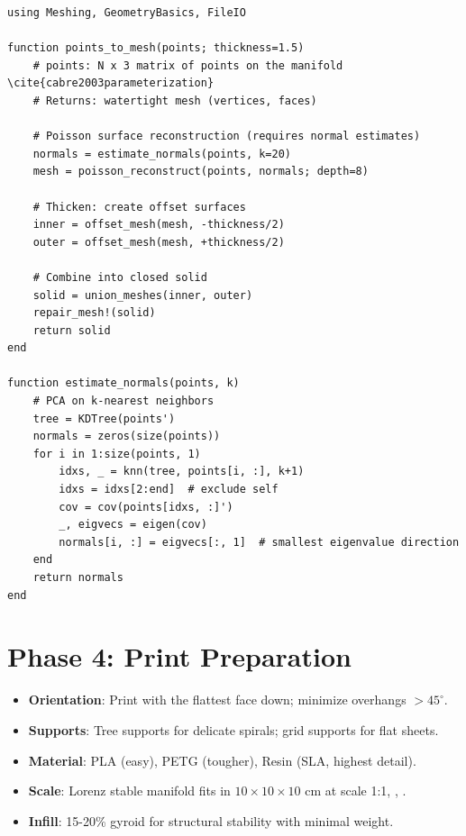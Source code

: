 \begin{lstlisting}[style=julia,caption=Mesh generation and thickening]
using Meshing, GeometryBasics, FileIO

function points_to_mesh(points; thickness=1.5)
    # points: N x 3 matrix of points on the manifold \cite{cabre2003parameterization}
    # Returns: watertight mesh (vertices, faces)
    
    # Poisson surface reconstruction (requires normal estimates)
    normals = estimate_normals(points, k=20)
    mesh = poisson_reconstruct(points, normals; depth=8)
    
    # Thicken: create offset surfaces
    inner = offset_mesh(mesh, -thickness/2)
    outer = offset_mesh(mesh, +thickness/2)
    
    # Combine into closed solid
    solid = union_meshes(inner, outer)
    repair_mesh!(solid)
    return solid
end

function estimate_normals(points, k)
    # PCA on k-nearest neighbors
    tree = KDTree(points')
    normals = zeros(size(points))
    for i in 1:size(points, 1)
        idxs, _ = knn(tree, points[i, :], k+1)
        idxs = idxs[2:end]  # exclude self
        cov = cov(points[idxs, :]')
        _, eigvecs = eigen(cov)
        normals[i, :] = eigvecs[:, 1]  # smallest eigenvalue direction
    end
    return normals
end
\end{lstlisting}

\section{Phase 4: Print Preparation}
\label{sec:3dp:printing}

\begin{itemize}
    \item \textbf{Orientation}: Print with the flattest face down; minimize overhangs $>45^\circ$.
    \item \textbf{Supports}: Tree supports for delicate spirals; grid supports for flat sheets.
    \item \textbf{Material}: PLA (easy), PETG (tougher), Resin (SLA, highest detail).
    \item \textbf{Scale}: Lorenz stable manifold fits in $10\times10\times10$ cm at scale 1:1, \cite{bishop2026printing}, \cite{cabre2003parameterization}.
    \item \textbf{Infill}: 15-20\% gyroid for structural stability with minimal weight.
\end{itemize}


